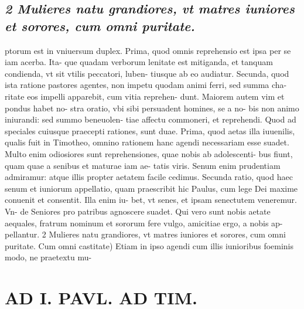 \documentclass{article}
\begin{document}
\begin{pages}
\subsection*{\textit{2 Mulieres natu grandiores, vt matres iuniores et sorores, cum omni puritate.}}ptorum est in vniuersum duplex. Prima, quod omnis reprehensio est ipsa per se iam acerba. Ita- que quadam verborum lenitate est mitiganda, et tanquam condienda, vt sit vtilis peccatori, luben- tiusque ab eo audiatur. Secunda, quod ista ratione pastores agentes, non impetu quodam animi ferri, sed summa cha- ritate eos impelli apparebit, cum vitia reprehen- dunt. Maiorem autem vim et pondus habet no- stra oratio, vbi sibi persuadent homines, se a no- bis non animo iniurandi: sed summo beneuolen- tiae affectu commoneri, et reprehendi. Quod ad speciales cuiusque praecepti rationes, sunt duae. Prima, quod aetas illa iuuenilis, qualis fuit in Timotheo, omnino rationem hanc agendi necessariam esse suadet. Multo enim odiosiores sunt reprehensiones, quae nobis ab adolescenti- bus fiunt, quam quae a senibus et maturae iam ae- tatis viris. Senum enim prudentiam admiramur: atque illis propter aetatem facile cedimus. Secunda ratio, quod haec senum et iuniorum appellatio, quam praescribit hic Paulus, cum lege Dei maxime conuenit et consentit. Illa enim iu- bet, vt senes, et ipsam senectutem veneremur. Vn- de Seniores pro patribus agnoscere suadet. Qui vero sunt nobis aetate aequales, fratrum nominum et sororum fere vulgo, amicitiae ergo, a nobis ap- pellantur. 2 Mulieres natu grandiores, vt matres iuniores et sorores, cum omni puritate. Cum omni castitate) Etiam in ipso agendi cum illis iunioribus foeminis modo, ne praetextu mu-  \pend
\section*{AD I. PAVL. AD TIM. }
\marginpar{[ p.252 ]}\pstart {}
{}

\end{pages}
\end{document}
